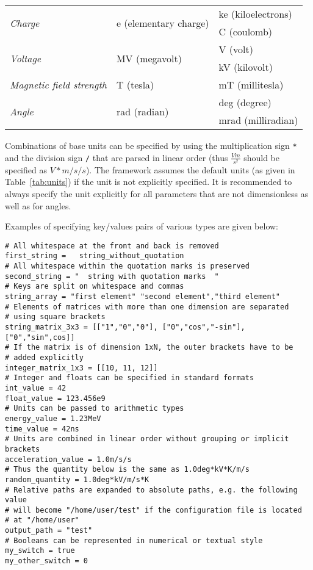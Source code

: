 \begin{table}[tbp]
\begin{tabular}{lll}
\midrule
\multirow{2}{*}{\textit{Charge}}  & \multirow{2}{*}{e (elementary charge)}  & ke (kiloelectrons)       \\
                                  &                                         & C (coulomb)              \\
\midrule
\multirow{2}{*}{\textit{Voltage}} & \multirow{2}{*}{MV (megavolt)}          & V (volt)                 \\
                                  &                                         & kV (kilovolt)            \\
\midrule
\textit{Magnetic field strength}  & T (tesla)                               & mT (millitesla)                 \\
\midrule
\multirow{2}{*}{\textit{Angle}}   & \multirow{2}{*}{rad (radian)}           & deg (degree)             \\
                                  &                                         & mrad (milliradian)       \\
\bottomrule
\end{tabular}
\end{table}

Combinations of base units can be specified by using the multiplication sign \texttt{*} and the division sign \texttt{/} that are parsed in linear order (thus $\frac{V m}{s^2}$ should be specified as $V*m/s/s$).
The framework assumes the default units (as given in Table~\ref{tab:units}) if the unit is not explicitly specified.
It is recommended to always specify the unit explicitly for all parameters that are not dimensionless as well as for angles.

Examples of specifying key/values pairs of various types are given below:
\begin{verbatim}
# All whitespace at the front and back is removed
first_string =   string_without_quotation
# All whitespace within the quotation marks is preserved
second_string = "  string with quotation marks  "
# Keys are split on whitespace and commas
string_array = "first element" "second element","third element"
# Elements of matrices with more than one dimension are separated
# using square brackets
string_matrix_3x3 = [["1","0","0"], ["0","cos","-sin"], ["0","sin",cos]]
# If the matrix is of dimension 1xN, the outer brackets have to be
# added explicitly
integer_matrix_1x3 = [[10, 11, 12]]
# Integer and floats can be specified in standard formats
int_value = 42
float_value = 123.456e9
# Units can be passed to arithmetic types
energy_value = 1.23MeV
time_value = 42ns
# Units are combined in linear order without grouping or implicit brackets
acceleration_value = 1.0m/s/s
# Thus the quantity below is the same as 1.0deg*kV*K/m/s
random_quantity = 1.0deg*kV/m/s*K
# Relative paths are expanded to absolute paths, e.g. the following value
# will become "/home/user/test" if the configuration file is located
# at "/home/user"
output_path = "test"
# Booleans can be represented in numerical or textual style
my_switch = true
my_other_switch = 0
\end{verbatim}

